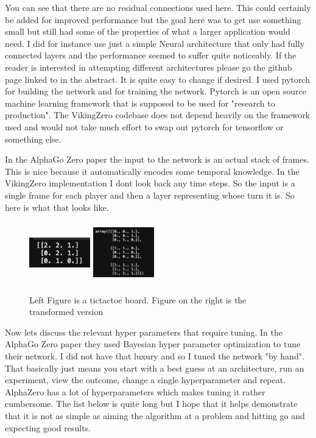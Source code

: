 You can see that there are no residual connections used here. This could certainly be added for improved performance but the goal here was to get use something small but still had some of the properties of what a larger application would need.  I did for instance use just a simple Neural architecture that only had fully connected layers and the performance seemed to suffer quite noticeably. If the reader is interested in attempting different architectures please go the github page linked to in the abstract. It is quite easy to change if desired. I used pytorch for building the network and for training the network. Pytorch is an open source machine learning framework that is supposed to be used for "research to production". The VikingZero codebase does not depend heavily on the framework used and would not take much effort to swap out pytorch for tensorflow or something else. 

In the AlphaGo Zero paper the input to the network is an actual stack of frames. This is nice because it automatically encodes some temporal knowledge. In the VikingZero implementation I dont look back any time steps. So the input is a single frame for each player and then a layer representing whose turn it is. So here is what that looks like. 

\begin{figure}[H]
       \centering
       \includegraphics[width=100px,height=100px]{experiments/demo_board_1.png}
       \includegraphics[width=100px,height=100px]{experiments/transform_demo_board.png}
       \caption{Left Figure is a tictactoe board. Figure on the right is the transformed version }
       \label{fig:my_label}
\end{figure}

Now lets discuss the relevant hyper parameters that require tuning. In the AlphaGo Zero paper they used Bayesian hyper parameter optimization to tune their network. I did not have that luxury and so I tuned the network "by hand". That basically just means you start with a best guess at an architecture, run an experiment, view the outcome, change a single hyperparameter and repeat. AlphaZero has a lot of hyperparameters which makes tuning it rather cumbersome. The list below is quite long but I hope that it helps demonstrate that it is not as simple as aiming the algorithm at a problem and hitting go and expecting good results. 

